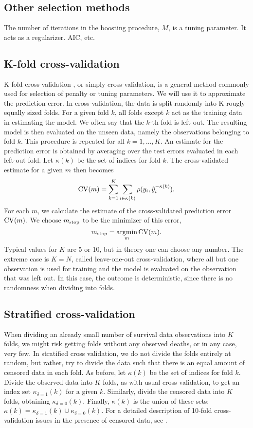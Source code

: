 \subsection{Other selection methods}
The number of iterations in the boosting procedure, $M$, is a tuning parameter. It acts as a regularizer. AIC, etc.

\subsection{K-fold cross-validation}
K-fold cross-validation \citep{lachenbruch}, or simply cross-validation, is a general method commonly used for selection of penalty or tuning parameters. We will use it to approximate the prediction error. In cross-validation, the data is split randomly into K rougly equally sized folds. For a given fold $k$, all folds except $k$ act as the training data in estimating the model. We often say that the $k$-th fold is left out. The resulting model is then evaluated on the unseen data, namely the observations belonging to fold $k$. This procedure is repeated for all $k=1,\ldots,K$. An estimate for the prediction error is obtained by averaging over the test errors evaluated in each left-out fold. Let $\kappa(k)$ be the set of indices for fold $k$. The cross-validated estimate for a given $m$ then becomes
\begin{equation}
    \operatorname{CV}(m)=\sum_{k=1}^K\sum_{i\in\kappa(k)}\rho(y_i,\hat{y}_i^{-\kappa(k)}).
\end{equation}
For each $m$, we calculate the estimate of the cross-validated prediction error $\operatorname{CV}(m)$. We choose $m_{\text{stop}}$ to be the minimizer of this error,
\begin{equation}
    m_{\text{stop}}=\operatorname*{argmin}_{m}\operatorname{CV}(m).
\end{equation}
Typical values for $K$ are 5 or 10, but in theory one can choose any number. The extreme case is $K=N$, called leave-one-out cross-validation, where all but one observation is used for training and the model is evaluated on the observation that was left out. In this case, the outcome is deterministic, since there is no randomness when dividing into folds.

\subsection{Stratified cross-validation}
When dividing an already small number of survival data observations into $K$ folds, we might risk getting folds without any observed deaths, or in any case, very few. In stratified cross validation, we do not divide the folds entirely at random, but rather, try to divide the data such that there is an equal amount of censored data in each fold.
As before, let $\kappa(k)$ be the set of indices for fold $k$. Divide the observed data into $K$ folds, as with usual cross validation, to get an index set $\kappa_{\delta=1}(k)$ for a given $k$. Similarly, divide the censored data into $K$ folds, obtaining $\kappa_{\delta=0}(k)$. Finally, $\kappa(k)$ is the union of these sets: $\kappa(k)=\kappa_{\delta=1}(k)\cup\kappa_{\delta=0}(k)$.
For a detailed description of 10-fold cross-validation issues in the presence of censored data, see \citet{kohavi}.

